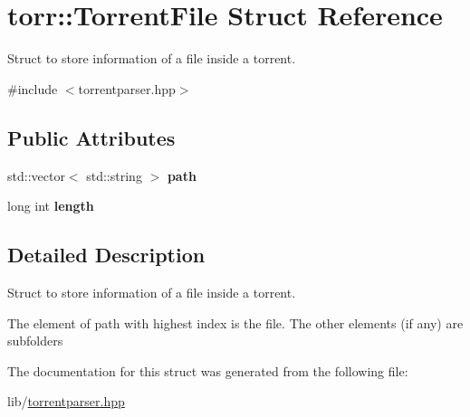 \hypertarget{structtorr_1_1TorrentFile}{}\section{torr\+:\+:Torrent\+File Struct Reference}
\label{structtorr_1_1TorrentFile}


Struct to store information of a file inside a torrent.  




{\ttfamily \#include $<$torrentparser.\+hpp$>$}

\subsection*{Public Attributes}
\begin{DoxyCompactItemize}
\item 
\mbox{\label{structtorr_1_1TorrentFile_ad3fc87794cb5e9747b5b8b7ed6812d56}} 
std\+::vector$<$ std\+::string $>$ {\bfseries path}
\item 
\mbox{\label{structtorr_1_1TorrentFile_a1bca57290044fa1172b7799f4aa92750}} 
long int {\bfseries length}
\end{DoxyCompactItemize}


\subsection{Detailed Description}
Struct to store information of a file inside a torrent. 

The element of path with highest index is the file. The other elements (if any) are subfolders 

The documentation for this struct was generated from the following file\+:\begin{DoxyCompactItemize}
\item 
lib/\hyperlink{torrentparser_8hpp}{torrentparser.\+hpp}\end{DoxyCompactItemize}
